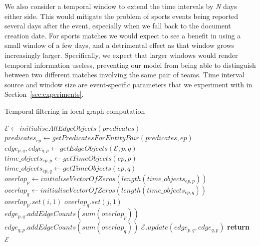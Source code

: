 \documentclass[11pt]{article}
\begin{document}
We also consider a temporal window to extend the time intervals by \textit{N} days either side. This would mitigate the problem of sports events being reported several days after the event, especially when we fall back to the document creation date. For sports matches we would expect to see a benefit in using a small window of a few days, and a detrimental effect as that window grows increasingly larger. Specifically, we expect that larger windows would render temporal information useless, preventing our model from being able to distinguish between two different matches involving the same pair of teams. Time interval source and window size are event-specific parameters that we experiment with in Section~\ref{sec:experiments}.


\begin{algorithm}[t]
  \small
  \caption{Temporal filtering in local graph computation}\label{temporal_filtering_2}
  \begin{algorithmic}[1]
      \State $\mathcal{E}\gets initialiseAllEdgeObjects(predicates)$ 
        \State $predicates_{ep}\gets getPredicatesForEntityPair(predicates,ep)$
                \State $edge_{p,q}, edge_{q,p}\gets getEdgeObjects(\mathcal{E},p,q)$
                \State $time\_objects_{ep,p}\gets getTimeObjects(ep,p)$
                \State $time\_objects_{ep,q}\gets getTimeObjects(ep,q)$
                \State $overlap_{p}\gets initialiseVectorOfZeros(length(time\_objects_{ep,p}))$
                \State $overlap_{q}\gets initialiseVectorOfZeros(length(time\_objects_{ep,q}))$
                            \State $overlap_{p}.set(i,1)$
							\State $overlap_{q}.set(j,1)$
                        \EndIf
                    \EndFor
                \EndFor
                \State $edge_{p,q}.addEdgeCounts(sum(overlap_{p}))$
                \State $edge_{q,p}.addEdgeCounts(sum(overlap_{q}))$
            \EndFor
            \State $\mathcal{E}.update(edge_{p,q}, edge_{q,p})$
        \EndFor
      \EndFor
      \State \textbf{return} $\mathcal{E}$
    \EndProcedure
  \end{algorithmic}
\end{algorithm}
\end{document}
